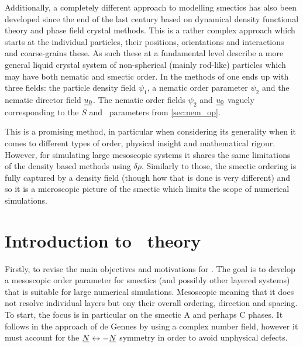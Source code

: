 \documentclass[12pt]{article}
\newcommand{\suf}[2]{\stackunder[0.5pt]{\stackunder[1pt]{\ensuremath{#1}}{\rule{\widthof{\ensuremath{#2}}*\real{0.9}}{.1ex}}}{}}
\newcommand{\duf}[2]{\stackunder[0.5pt]{\stackunder[0.8pt]{\stackunder[1pt]{\ensuremath{#1}}{\rule{\widthof{\ensuremath{#2}}*\real{0.9}}{.1ex}}}{\rule{\widthof{\ensuremath{#2}}*\real{0.9}}{.1ex}}}{}}
\newcommand{\su}[1]{\suf{#1}{#1}}
\newcommand{\du}[1]{\duf{#1}{#1}}
\newcommand{\NN}{\su{N}}
\newcommand{\EE}{\du{E}}
\begin{document}
Additionally, a completely different approach to modelling smectics has also been developed since the end of the last century based on dynamical density functional theory and phase field crystal methods\cite{lowenPhasefieldcrystalModelLiquid2010,elderModelingElasticPlastic2004,achimStabilityLiquidCrystalline2011,vitralPhasefieldModelWeakly2021,nestlerActiveSmecticsSphere2023}.
This is a rather complex approach which starts at the individual particles, their positions, orientations and interactions and coarse-grains these.
As such these at a fundamental level describe a more general liquid crystal system of non-spherical (mainly rod-like) particles which may have both nematic and smectic order.
In the methods of \cite{lowenPhasefieldcrystalModelLiquid2010} one ends up with three fields: the particle density field $\psi_1$, a nematic order parameter $\psi_2$ and the nematic director field $\su{u_0}$.
The nematic order fields $\psi_2$ and $\su{u_0}$ vaguely corresponding to the $S$ and \NN\ parameters from \cref{sec:nem_op}.

This is a promising method, in particular when considering its generality when it comes to different types of order, physical insight and mathematical rigour.
However, for simulating large mesoscopic systems it shares the same limitations of the density based methods using $\delta\rho$.
Similarly to those, the smectic ordering is fully captured by a density field (though how that is done is very different) and so it is a microscopic picture of the smectic which limits the scope of numerical simulations.


\section{Introduction to \EE\ theory}
Firstly, to revise the main objectives and motivations for \EE.
The goal is to develop a mesoscopic order parameter for smectics (and possibly other layered systems) that is suitable for large numerical simulations.
Mesoscopic meaning that it does not resolve individual layers but ony their overall ordering, direction and spacing.
To start, the focus is in particular on the smectic A and perhaps C phases.
It follows in the approach of de Gennes by using a complex number field, however it must account for the $\su{N} \leftrightarrow -\su{N}$ symmetry in order to avoid unphysical defects.
\end{document}
